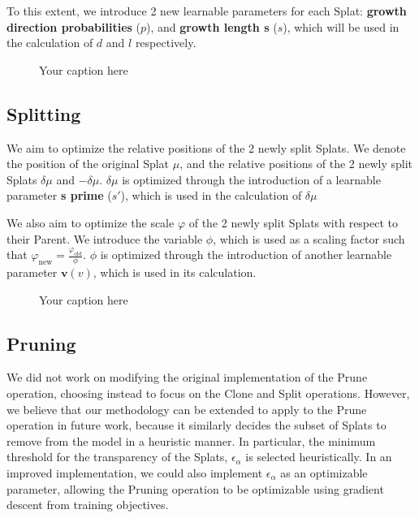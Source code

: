 \documentclass[11pt]{report}
\begin{document}
To this extent, we introduce 2 new learnable parameters for each Splat: \textbf{growth direction probabilities} ($p$), and \textbf{growth length s} ($s$), which will be used in the calculation of $d$ and $l$ respectively.

\begin{figure}[H]
    \centering
    
    \caption{Your caption here}
    \label{fig:your_label}
\end{figure}

\subsection{Splitting}
We aim to optimize the relative positions of the 2 newly split Splats. We denote the position of the original Splat $\mu$, and the relative positions of the 2 newly split Splats $\delta \mu$ and $- \delta \mu$. $\delta \mu$ is optimized through the introduction of a learnable parameter \textbf{s prime} ($s'$), which is used in the calculation of $\delta \mu$

We also aim to optimize the scale $\varphi$ of the 2 newly split Splats with respect to their Parent. We introduce the variable $\phi$, which is used as a scaling factor such that $\varphi_{\text{new}} = \frac{\varphi_{\text{old}}}{\phi}$. $\phi$ is optimized through the introduction of another learnable parameter $\mathbf{v}(v)$, which is used in its calculation.

\begin{figure}[H]
    \centering
    
    \caption{Your caption here}
    \label{fig:split}
\end{figure}


\subsection{Pruning}
We did not work on modifying the original implementation of the Prune operation, choosing instead to focus on the Clone and Split operations. However, we believe that our methodology can be extended to apply to the Prune operation in future work, because it similarly decides the subset of Splats to remove from the model in a heuristic manner. In particular, the minimum threshold for the transparency of the Splats, $\epsilon_{\alpha}$ is selected heuristically. In an improved implementation, we could also implement $\epsilon_{\alpha}$ as an optimizable parameter, allowing the Pruning operation to be optimizable using gradient descent from training objectives.
\end{document}
